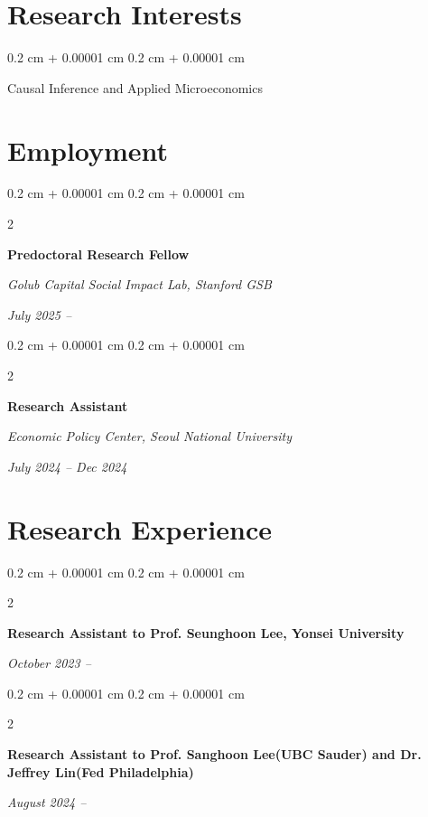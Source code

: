 \documentclass[10pt, letterpaper]{article}
\newenvironment{onecolentry}{
	\begin{adjustwidth}{
			0.2 cm + 0.00001 cm
		}{
			0.2 cm + 0.00001 cm
		}
	}{
	\end{adjustwidth}
} %
\newenvironment{twocolentry}[2][]{
	\onecolentry
	\def\secondColumn{#2}
	\setcolumnwidth{\fill, 4.5 cm}
	\begin{paracol}{2}
	}{
		\switchcolumn \raggedleft \secondColumn
	\end{paracol}
	\endonecolentry
} %
\begin{document}
	
	
	
		\section{Research Interests}
	
	\begin{onecolentry}
Causal Inference and Applied Microeconomics
	\end{onecolentry}
	
	\vspace{12pt}
	
	
	\section{Employment}
	
			\begin{twocolentry}{
			\textit{July 2025 –}    
			
			\textit{}}
		\textbf{Predoctoral Research Fellow}
		
		\textit{Golub Capital Social Impact Lab, Stanford GSB}
	\end{twocolentry}
	
	\vspace{0.20cm}
		\begin{twocolentry}{
			\textit{July 2024 – Dec 2024}    
			
			\textit{}}
		\textbf{Research Assistant}
		
		\textit{Economic Policy Center, Seoul National University}
	\end{twocolentry}
	
	
	
	\vspace{12pt}
	
	\section{Research Experience}
	
			\begin{twocolentry}{
			\textit{October 2023 –}    }
		\textbf{Research Assistant to Prof. Seunghoon Lee, Yonsei University}
		
	\end{twocolentry}
	
\vspace{12pt}
				\begin{twocolentry}{
			\textit{August 2024 –}    
			}
		\textbf{Research Assistant to Prof. Sanghoon Lee(UBC Sauder) and Dr. Jeffrey Lin(Fed Philadelphia)}
		
	\end{twocolentry}
	
\end{document}
